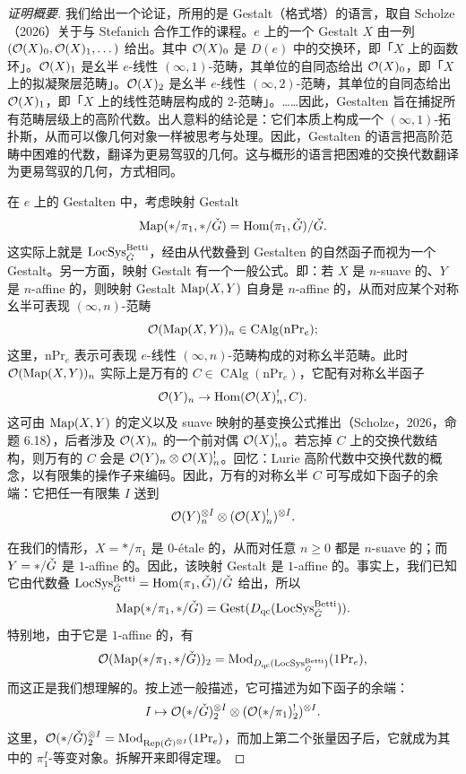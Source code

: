 \begin{proof}[证明概要]
我们给出一个论证，所用的是 Gestalt（格式塔）的语言，取自 Scholze（2026）关于与 Stefanich 合作工作的课程。$e$ 上的一个 Gestalt $X$ 由一列 $(\mathcal{O}(X)_0,\mathcal{O}(X)_1,\dots)$ 给出。其中 $\mathcal{O}(X)_0$ 是 $D(e)$ 中的交换环，即「$X$ 上的函数环」。$\mathcal{O}(X)_1$ 是幺半 $e$-线性 $(\infty,1)$-范畴，其单位的自同态给出 $\mathcal{O}(X)_0$，即「$X$ 上的拟凝聚层范畴」。$\mathcal{O}(X)_2$ 是幺半 $e$-线性 $(\infty,2)$-范畴，其单位的自同态给出 $\mathcal{O}(X)_1$，即「$X$ 上的线性范畴层构成的 2-范畴」。……因此，Gestalten 旨在捕捉所有范畴层级上的高阶代数。出人意料的结论是：它们本质上构成一个 $(\infty,1)$-拓扑斯，从而可以像几何对象一样被思考与处理。因此，Gestalten 的语言把高阶范畴中困难的代数，翻译为更易驾驭的几何。这与概形的语言把困难的交换代数翻译为更易驾驭的几何，方式相同。

在 $e$ 上的 Gestalten 中，考虑映射 Gestalt
\[
\operatorname{Map}(\ast/\pi_1,\ast/\check{G})=\operatorname{Hom}(\pi_1,\check{G})/\check{G}.
\]
这实际上就是 $\operatorname{LocSys}^{\mathrm{Betti}}_{\check{G}}$，经由从代数叠到 Gestalten 的自然函子而视为一个 Gestalt。另一方面，映射 Gestalt 有一个一般公式。即：若 $X$ 是 $n$-suave 的、$Y$ 是 $n$-affine 的，则映射 Gestalt $\operatorname{Map}(X,Y)$ 自身是 $n$-affine 的，从而对应某个对称幺半可表现 $(\infty,n)$-范畴
\[
\mathcal{O}(\operatorname{Map}(X,Y))_n\in\operatorname{CAlg}(\mathrm{nPr}_e);
\]
这里，$\mathrm{nPr}_e$ 表示可表现 $e$-线性 $(\infty,n)$-范畴构成的对称幺半范畴。此时 $\mathcal{O}(\operatorname{Map}(X,Y))_n$ 实际上是万有的 $C\in\operatorname{CAlg}(\mathrm{nPr}_e)$，它配有对称幺半函子
\[
\mathcal{O}(Y)_n\to\operatorname{Hom}(\mathcal{O}(X)^!_n,C).
\]
这可由 $\operatorname{Map}(X,Y)$ 的定义以及 suave 映射的基变换公式推出（Scholze，2026，命题 6.18），后者涉及 $\mathcal{O}(X)_n$ 的一个前对偶 $\mathcal{O}(X)^!_n$。若忘掉 $C$ 上的交换代数结构，则万有的 $C$ 会是 $\mathcal{O}(Y)_n\otimes\mathcal{O}(X)^!_n$。回忆：Lurie 高阶代数中交换代数的概念，以有限集的操作子来编码。因此，万有的对称幺半 $C$ 可写成如下函子的余端：它把任一有限集 $I$ 送到
\[
\mathcal{O}(Y)^{\otimes I}_n\otimes(\mathcal{O}(X)^!_n)^{\otimes I}.
\]

在我们的情形，$X=\ast/\pi_1$ 是 $0$-étale 的，从而对任意 $n\ge 0$ 都是 $n$-suave 的；而 $Y=\ast/\check{G}$ 是 $1$-affine 的。因此，该映射 Gestalt 是 $1$-affine 的。事实上，我们已知它由代数叠 $\operatorname{LocSys}^{\mathrm{Betti}}_{\check{G}}=\operatorname{Hom}(\pi_1,\check{G})/\check{G}$ 给出，所以
\[
\operatorname{Map}(\ast/\pi_1,\ast/\check{G})=\mathrm{Gest}(D_{\mathrm{qc}}(\operatorname{LocSys}^{\mathrm{Betti}}_{\check{G}})).
\]
特别地，由于它是 $1$-affine 的，有
\[
\mathcal{O}(\operatorname{Map}(\ast/\pi_1,\ast/\check{G}))_2=\operatorname{Mod}_{D_{\mathrm{qc}}(\operatorname{LocSys}^{\mathrm{Betti}}_{\check{G}})}(\mathrm{1Pr}_e),
\]
而这正是我们想理解的。按上述一般描述，它可描述为如下函子的余端：
\[
I\mapsto\mathcal{O}(\ast/\check{G})^{\otimes I}_2\otimes(\mathcal{O}(\ast/\pi_1)^!_2)^{\otimes I}.
\]
这里，$\mathcal{O}(\ast/\check{G})^{\otimes I}_2=\operatorname{Mod}_{\operatorname{Rep}(\check{G})^{\otimes I}}(\mathrm{1Pr}_e)$，而加上第二个张量因子后，它就成为其中的 $\pi_1^I$-等变对象。拆解开来即得定理。
\end{proof}

